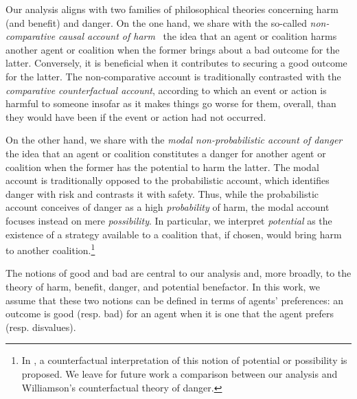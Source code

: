 \documentclass{article}
\begin{document}
Our analysis aligns with two families of philosophical theories concerning harm (and benefit) and danger.  
On the one hand, we share with the so-called \textit{non-comparative causal account of harm}~\cite{Harman2009HarmingAsCausingHarm,Bradley2012DoingAwayWithHarm} the idea that an agent or coalition harms another agent or coalition when the former brings about a bad outcome for the latter. Conversely, it is beneficial when it contributes to securing a good outcome for the latter.
The non-comparative account is traditionally contrasted with the \textit{comparative counterfactual account}, according to which an event or action is harmful to someone insofar as it makes things go worse for them, overall, than they would have been if the event or action had not occurred. 



On the other hand, we share with the  \textit{modal non-probabilistic account of danger}~\cite{Fassio2025OnDanger,Garland2003RiseOfRisk,Peschard2022PhilosophyRisk} the idea that an  agent  or coalition constitutes a danger for another agent or coalition when the former has the  potential   to  harm the latter.
The modal account is traditionally opposed to the probabilistic account, which identifies danger with risk and contrasts it with safety. Thus, while the probabilistic account conceives of danger as a high \emph{probability} of harm, the modal account focuses instead on mere \emph{possibility}. 
In particular, we interpret \emph{potential} as the existence of a strategy available to a coalition that, if chosen, would bring harm to another coalition.\footnote{In \cite{Williamson2009ProbabilityDanger}, a counterfactual interpretation of this notion of potential or possibility is proposed. We leave for future work a comparison between our analysis and Williamson’s counterfactual theory of danger.}

The notions of good and bad are central to our analysis and, more broadly, to the theory of harm, benefit, danger, and potential benefactor. In this work, we assume that these two notions can be defined in terms of agents’ preferences: an outcome is good (resp. bad) for an agent when it is one that the agent prefers (resp. disvalues).
 
\end{document}
